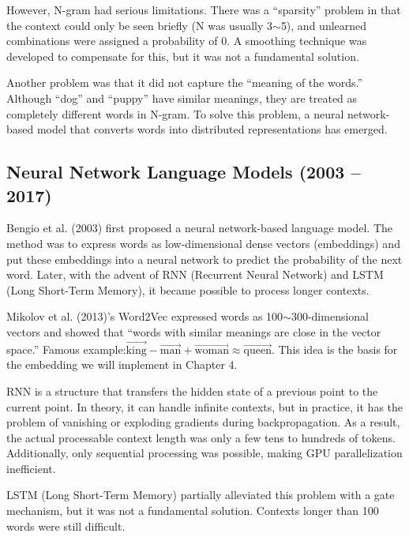 However, N-gram had serious limitations. There was a ``sparsity'' problem in that the context could only be seen briefly (N was usually 3$\sim$5), and unlearned combinations were assigned a probability of 0. A smoothing technique was developed to compensate for this, but it was not a fundamental solution.

Another problem was that it did not capture the ``meaning of the words.'' Although ``dog'' and ``puppy'' have similar meanings, they are treated as completely different words in N-gram. To solve this problem, a neural network-based model that converts words into distributed representations has emerged.

\subsection{Neural Network Language Models (2003  --  2017)}

Bengio et al. (2003) first proposed a neural network-based language model. The method was to express words as low-dimensional dense vectors (embeddings) and put these embeddings into a neural network to predict the probability of the next word. Later, with the advent of RNN (Recurrent Neural Network) and LSTM (Long Short-Term Memory), it became possible to process longer contexts.

\begin{infobox}
Mikolov et al. (2013)'s Word2Vec expressed words as 100$\sim$300-dimensional vectors and showed that ``words with similar meanings are close in the vector space.'' Famous example:$\vec{\text{king}} - \vec{\text{man}} + \vec{\text{woman}} \approx \vec{\text{queen}}$. This idea is the basis for the embedding we will implement in Chapter 4.
\end{infobox}

\begin{warnbox}
RNN is a structure that transfers the hidden state of a previous point to the current point. In theory, it can handle infinite contexts, but in practice, it has the problem of vanishing or exploding gradients during backpropagation. As a result, the actual processable context length was only a few tens to hundreds of tokens. Additionally, only sequential processing was possible, making GPU parallelization inefficient.

LSTM (Long Short-Term Memory) partially alleviated this problem with a gate mechanism, but it was not a fundamental solution. Contexts longer than 100 words were still difficult.
\end{warnbox}

